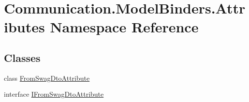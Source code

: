 \hypertarget{namespace_communication_1_1_model_binders_1_1_attributes}{}\section{Communication.\+Model\+Binders.\+Attributes Namespace Reference}
\label{namespace_communication_1_1_model_binders_1_1_attributes}
\subsection*{Classes}
\begin{DoxyCompactItemize}
\item 
class \mbox{\hyperlink{class_communication_1_1_model_binders_1_1_attributes_1_1_from_swag_dto_attribute}{From\+Swag\+Dto\+Attribute}}
\item 
interface \mbox{\hyperlink{interface_communication_1_1_model_binders_1_1_attributes_1_1_i_from_swag_dto_attribute}{I\+From\+Swag\+Dto\+Attribute}}
\end{DoxyCompactItemize}
